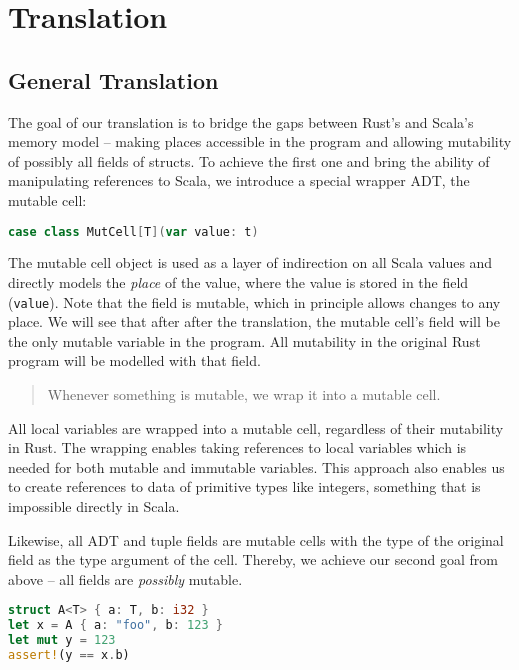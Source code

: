 \section{Translation}

\subsection{General Translation}

The goal of our translation is to bridge the gaps between Rust's and
Scala's memory model -- making places accessible in the program and
allowing mutability of possibly all fields of structs. To achieve the
first one and bring the ability of manipulating references to Scala, we
introduce a special wrapper ADT, the mutable cell:

\begin{lstlisting}[language=Scala, style=short]
case class MutCell[T](var value: t)
\end{lstlisting}

The mutable cell object is used as a layer of indirection on all Scala
values and directly models the \emph{place} of the value, where the
value is stored in the field (\passthrough{\lstinline!value!}). Note
that the field is mutable, which in principle allows changes to any
place. We will see that after after the translation, the mutable cell's
field will be the only mutable variable in the program. All mutability
in the original Rust program will be modelled with that field.

\begin{quote}
Whenever something is mutable, we wrap it into a mutable cell.
\end{quote}

All local variables are wrapped into a mutable cell, regardless of their
mutability in Rust. The wrapping enables taking references to local
variables which is needed for both mutable and immutable variables. This
approach also enables us to create references to data of primitive types
like integers, something that is impossible directly in Scala.

Likewise, all ADT and tuple fields are mutable cells with the type of
the original field as the type argument of the cell. Thereby, we achieve
our second goal from above -- all fields are \emph{possibly} mutable.

\begin{lstlisting}[language=Rust, caption=Some example Rust code.]
struct A<T> { a: T, b: i32 }
let x = A { a: "foo", b: 123 }
let mut y = 123
assert!(y == x.b)
\end{lstlisting}

